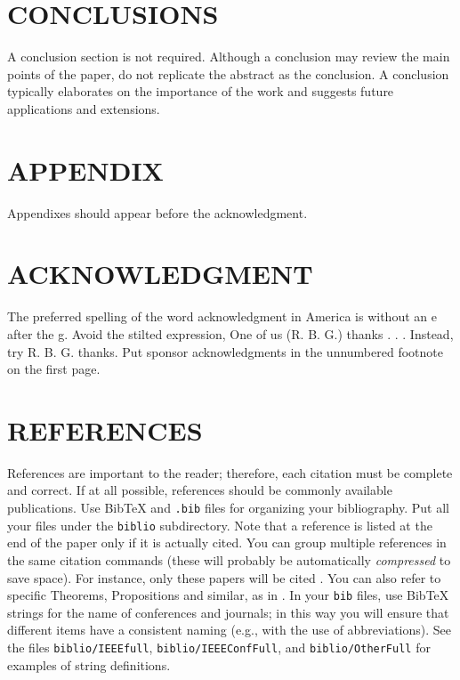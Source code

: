 \documentclass[letterpaper, 10 pt, conference]{ieeeconf}
\begin{document}
\section{CONCLUSIONS}

A conclusion section is not required. Although a conclusion may review the main points of the paper, do not replicate the abstract as the conclusion. A conclusion typically elaborates on the importance of the work and suggests future applications and extensions.


\section*{APPENDIX}

Appendixes should appear before the acknowledgment.

\section*{ACKNOWLEDGMENT}

The preferred spelling of the word acknowledgment in America is without an e after the g. Avoid the stilted expression, One of us (R. B. G.) thanks . . .  Instead, try R. B. G. thanks. Put sponsor acknowledgments in the unnumbered footnote on the first page.

\section*{REFERENCES}
References are important to the reader; therefore, each citation must be complete and correct. If at all possible, references should be commonly available publications. Use BibTeX and \texttt{.bib} files for organizing your bibliography. Put all your files under the \texttt{biblio} subdirectory. Note that a reference is listed at the end of the paper only if it is actually cited. You can group multiple references in the same citation commands (these will probably be automatically \emph{compressed} to save space). For instance, only these papers will be cited \cite{Tron:CVPR07,Tron:CDC09,Tron:SPM11,nestmeyer2015decentralized}. You can also refer to specific Theorems, Propositions and similar, as in \cite[Prop. 1]{Tron:CDC09}. In your \texttt{bib} files, use BibTeX strings for the name of conferences and journals; in this way you will ensure that different items have a consistent naming (e.g., with the use of abbreviations). See the files \texttt{biblio/IEEEfull}, \texttt{biblio/IEEEConfFull}, and \texttt{biblio/OtherFull} for examples of string definitions.




\end{document}
